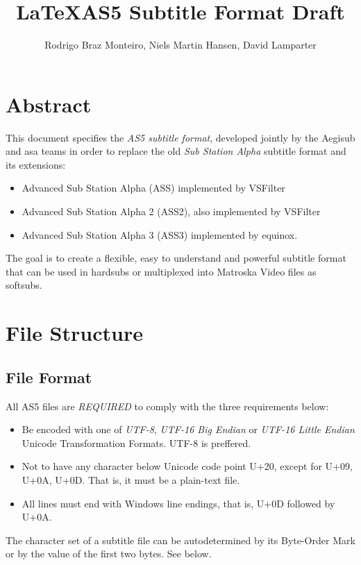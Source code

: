 \documentclass{spec}
\title{\LaTeX}
\date{}
\begin{document}
\title{AS5 Subtitle Format Draft}
\author{Rodrigo Braz Monteiro, Niels Martin Hansen, David Lamparter}
\spectitle


\section{Abstract}
This document specifies the \emph{AS5 subtitle format}, developed jointly by the
Aegisub\cite{Aegisub} and asa\cite{asa} teams in order to replace the old
\emph{Sub Station Alpha}\cite{SSA} subtitle format and its extensions:

\begin{itemize}
\item Advanced Sub Station Alpha (ASS) implemented by VSFilter\cite{VSFilter}
\item Advanced Sub Station Alpha 2 (ASS2), also implemented by VSFilter
\item Advanced Sub Station Alpha 3 (ASS3) implemented by equinox.
\end{itemize}

The goal is to create a flexible, easy to understand and powerful subtitle format
that can be used in hardsubs or multiplexed into Matroska Video\cite{mkv} files as
softsubs.


\section{File Structure}
\subsection{File Format}
All AS5 files are \emph{REQUIRED} to comply with the three requirements below:

\begin{itemize}
\item Be encoded with one of \emph{UTF-8}\cite{UTF-8}, \emph{UTF-16 Big Endian}
\cite{UTF-16} or \emph{UTF-16 Little Endian} Unicode Transformation Formats. UTF-8 is
preffered.
\item Not to have any character below Unicode code point U+20, except for U+09, U+0A, U+0D.
That is, it must be a plain-text file.
\item All lines must end with Windows line endings, that is, U+0D followed by U+0A.
\end{itemize}

The character set of a subtitle file can be autodetermined by its Byte-Order Mark or by
the value of the first two bytes. See below.
\end{document}
